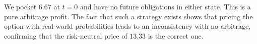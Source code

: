 \documentclass[12pt,a4paper]{article}
\begin{document}
\medskip
We pocket $\mathbf{6.67}$ at $t = 0$ and have no future obligations in either state. This is a pure arbitrage profit. The fact that such a strategy exists shows that pricing the option with real-world probabilities leads to an inconsistency with no-arbitrage, confirming that the risk-neutral price of $13.33$ is the correct one.
\end{document}
